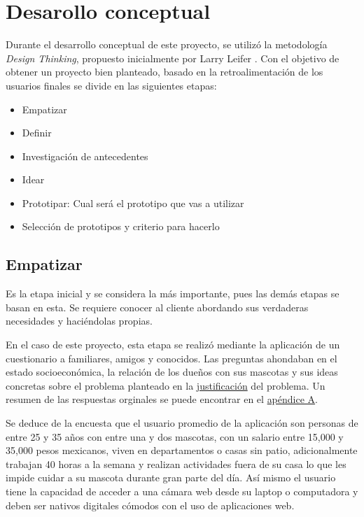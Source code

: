\section{Desarollo conceptual}

Durante el desarrollo conceptual de este proyecto, se utilizó la metodología \textit{Design Thinking}, propuesto inicialmente por Larry Leifer \textcite{plattner2011}. Con el objetivo de obtener un proyecto bien planteado, basado en la retroalimentación de los usuarios finales se divide en las siguientes etapas:


\begin{itemize}
  \item Empatizar
  \item Definir
  \item Investigación de antecedentes
  \item Idear
  \item Prototipar: Cual será el prototipo que vas a utilizar
  \item Selección de prototipos y criterio para hacerlo  
\end{itemize}


\subsection{Empatizar}

Es la etapa inicial y se considera la más importante, pues las demás etapas se basan en esta. Se requiere conocer al cliente abordando sus verdaderas necesidades y haciéndolas propias. 

En el caso de este proyecto, esta etapa se realizó mediante la aplicación de un cuestionario a familiares, amigos y conocidos. Las preguntas ahondaban en el estado socioeconómica, la relación de los dueños con sus mascotas y sus ideas concretas sobre el problema planteado en la \hyperref[sec:justificacion]{justificación} del problema. Un resumen de las respuestas orginales se puede encontrar en el \hyperref[ape:tablaencuesta]{apéndice A}.


Se deduce de la encuesta que el usuario promedio de la aplicación son personas de entre 25 y 35 años con entre una y dos mascotas, con un salario entre 15,000 y 35,000 pesos mexicanos, viven en departamentos o casas sin patio, adicionalmente trabajan 40 horas a la semana y realizan actividades fuera de su casa lo que les impide cuidar a su mascota durante gran parte del día. Así mismo el usuario tiene la capacidad de acceder a una cámara web desde su laptop o computadora y deben ser nativos digitales cómodos con el uso de aplicaciones web.

